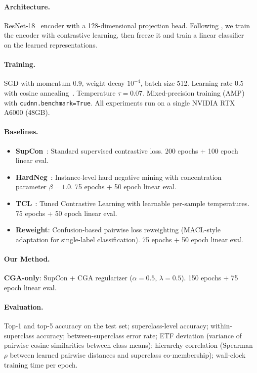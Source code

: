 \documentclass{article}
\begin{document}
\paragraph{Architecture.} ResNet-18~\citep{he2016deep} encoder with a 128-dimensional projection head. Following \citet{khosla2020supervised}, we train the encoder with contrastive learning, then freeze it and train a linear classifier on the learned representations.

\paragraph{Training.} SGD with momentum 0.9, weight decay $10^{-4}$, batch size 512. Learning rate 0.5 with cosine annealing~\citep{loshchilov2017sgdr}. Temperature $\tau = 0.07$. Mixed-precision training (AMP) with \texttt{cudnn.benchmark=True}. All experiments run on a single NVIDIA RTX A6000 (48GB).

\paragraph{Baselines.}
\begin{itemize}
    \item \textbf{SupCon}~\citep{khosla2020supervised}: Standard supervised contrastive loss. 200 epochs + 100 epoch linear eval.
    \item \textbf{HardNeg}~\citep{robinson2021contrastive}: Instance-level hard negative mining with concentration parameter $\beta=1.0$. 75 epochs + 50 epoch linear eval.
    \item \textbf{TCL}~\citep{animesh2025tuned}: Tuned Contrastive Learning with learnable per-sample temperatures. 75 epochs + 50 epoch linear eval.
    \item \textbf{Reweight}: Confusion-based pairwise loss reweighting (MACL-style adaptation for single-label classification). 75 epochs + 50 epoch linear eval.
\end{itemize}

\paragraph{Our Method.} \textbf{CGA-only}: SupCon + CGA regularizer ($\alpha=0.5$, $\lambda=0.5$). 150 epochs + 75 epoch linear eval.

\paragraph{Evaluation.} Top-1 and top-5 accuracy on the test set; superclass-level accuracy; within-superclass accuracy; between-superclass error rate; ETF deviation (variance of pairwise cosine similarities between class means); hierarchy correlation (Spearman $\rho$ between learned pairwise distances and superclass co-membership); wall-clock training time per epoch.
\end{document}
